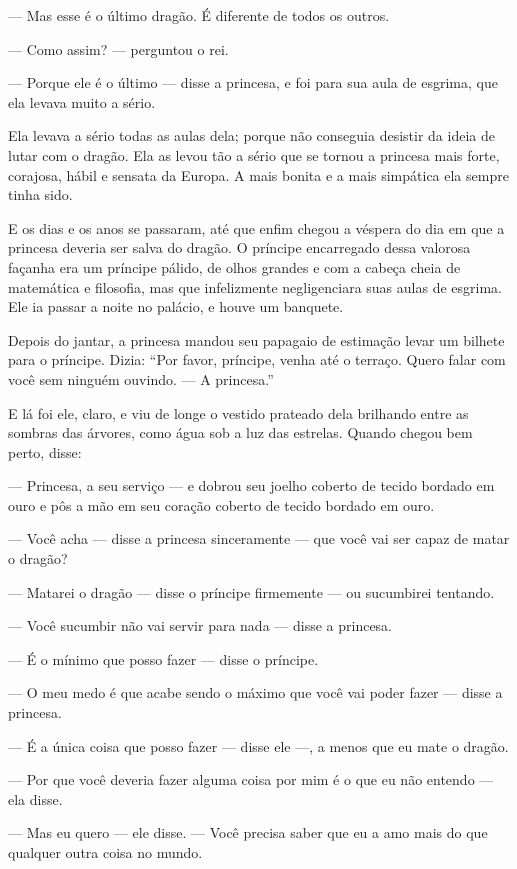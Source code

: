 --- Mas esse é o último dragão. É diferente de todos os outros.

--- Como assim? --- perguntou o rei.

--- Porque ele é o último --- disse a princesa, e foi para sua aula de
esgrima, que ela levava muito a sério. 

Ela levava a sério todas as
aulas dela; porque não conseguia desistir da ideia de lutar com o
dragão. Ela as levou tão a sério que se tornou a princesa mais forte,
corajosa, hábil e sensata da Europa. A mais bonita e a mais simpática
ela sempre tinha sido. 

E os dias e os anos se passaram, até que enfim chegou a véspera do dia
em que a princesa deveria ser salva do dragão. O príncipe encarregado
dessa valorosa façanha era um príncipe pálido, de olhos grandes e com
a cabeça cheia de matemática e filosofia, mas que infelizmente
negligenciara suas aulas de esgrima. Ele ia passar a noite no
palácio, e houve um banquete.

Depois do jantar, a princesa mandou seu papagaio de estimação levar 
um bilhete para o príncipe. Dizia: “Por favor, príncipe, venha até o
terraço. Quero falar com você sem ninguém ouvindo. --- A princesa.”

E lá foi ele, claro, e viu de longe o vestido prateado dela brilhando
entre as sombras das árvores, como água sob a luz das estrelas. 
Quando chegou bem perto, disse:

--- Princesa, a seu serviço --- e dobrou seu joelho coberto de
tecido bordado em ouro e pôs a mão em seu coração coberto de
tecido bordado em ouro.

--- Você acha --- disse a princesa sinceramente --- que você vai ser capaz
de matar o dragão?

--- Matarei o dragão --- disse o príncipe firmemente --- ou sucumbirei
tentando. 

--- Você sucumbir não vai servir para nada --- disse a princesa. 

--- É o mínimo que posso fazer --- disse o príncipe.

--- O meu medo é que acabe sendo o máximo que você vai poder fazer ---
disse a princesa.

--- É a única coisa que posso fazer --- disse ele ---, a menos que eu mate o
dragão.

--- Por que você deveria fazer alguma coisa por mim é o que eu não
entendo --- ela disse.

--- Mas eu quero --- ele disse. --- Você precisa saber que eu a amo mais do
que qualquer outra coisa no mundo. 

